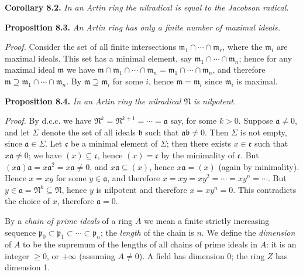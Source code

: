\noindent\textbf{Corollary 8.2.} \emph{In an Artin ring the nilradical is equal to the Jacobson radical.} \proofbox

\noindent\textbf{Proposition 8.3.} \emph{An Artin ring has only a finite number of maximal ideals.}

\noindent\emph{Proof.} Consider the set of all finite intersections \(\mathfrak m_1\cap\cdots\cap\mathfrak m_r\), where the \(\mathfrak m_i\) are maximal ideals. This set has a minimal element, say \(\mathfrak m_1\cap\cdots\cap\mathfrak m_n\); hence for any maximal ideal \(\mathfrak m\) we have \(\mathfrak m\cap\mathfrak m_1\cap\cdots\cap\mathfrak m_n=\mathfrak m_1\cap\cdots\cap\mathfrak m_n\), and therefore \(\mathfrak m\supseteq\mathfrak m_1\cap\cdots\cap\mathfrak m_n\). By  \(\mathfrak m\supseteq\mathfrak m_i\) for some \(i\), hence \(\mathfrak m=\mathfrak m_i\) since \(\mathfrak m_i\) is maximal. \proofbox

\noindent\textbf{Proposition 8.4.} \emph{In an Artin ring the nilradical \(\mathfrak N\) is nilpotent.}

\noindent\emph{Proof.} By d.c.c. we have \(\mathfrak N^k=\mathfrak N^{k+1}=\cdots=\mathfrak a\) say, for some \(k>0\). Suppose \(\mathfrak a\neq0\), and let \(\Sigma\) denote the set of all ideals \(\mathfrak b\) such that \(\mathfrak a\mathfrak b\neq0\). Then \(\Sigma\) is not empty, since \(\mathfrak a\in\Sigma\). Let \(\mathfrak c\) be a minimal element of \(\Sigma\); then there exists \(x\in\mathfrak c\) such that \(x\mathfrak a\neq0\); we have \((x)\subseteq\mathfrak c\), hence \((x)=\mathfrak c\) by the minimality of \(\mathfrak c\). But \((x\mathfrak a)\mathfrak a=x\mathfrak a^2=x\mathfrak a\neq0\), and \(x\mathfrak a\subseteq(x)\), hence \(x\mathfrak a=(x)\) (again by minimality). Hence \(x=xy\) for some \(y\in\mathfrak a\), and therefore \(x=xy=xy^2=\cdots=xy^n=\cdots\). But \(y\in\mathfrak a=\mathfrak N^k\subseteq\mathfrak N\), hence \(y\) is nilpotent and therefore \(x=xy^n=0\). This contradicts the choice of \(x\), therefore \(\mathfrak a=0\). \proofbox

By a \emph{chain of prime ideals} of a ring \(A\) we mean a finite strictly increasing sequence \(\mathfrak p_0\subset\mathfrak p_1\subset\cdots\subset\mathfrak p_n\); the \emph{length} of the chain is \(n\). We define the \emph{dimension} of \(A\) to be the supremum of the lengths of all chains of prime ideals in \(A\): it is an integer \(\geq0\), or \(+\infty\) (assuming \(A\neq0\)). A field has dimension 0; the ring \(Z\) has dimension 1.

